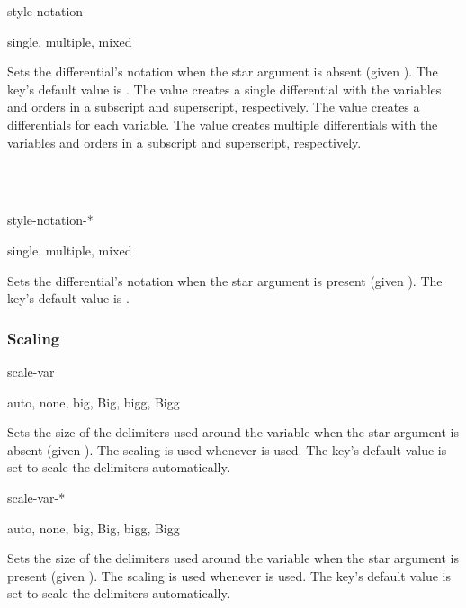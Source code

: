 	\begin{option}{style-notation}
		\begin{values}[default = multiple]
			single, multiple, mixed
		\end{values}
		Sets the differential's notation when the star argument is absent (given ). The key's default value is . The value  creates a single differential with the variables and orders in a subscript and superscript, respectively. The value  creates a differentials for each variable. The value  creates multiple differentials with the variables and orders in a subscript and superscript, respectively.
		
		\begin{example}
			 \\
			 \\
		\end{example}
		
	\end{option}
	
	\begin{option}{style-notation-*}
		\begin{values}[default = single]
			single, multiple, mixed
		\end{values}
		Sets the differential's notation when the star argument is present (given ). The key's default value is .
	\end{option}
	
	\subsubsection*{Scaling}
	
	\begin{option}{scale-var}
		\begin{values}[default = auto]
			auto, none, big, Big, bigg, Bigg
		\end{values}
		Sets the size of the delimiters used around the variable when the star argument is absent (given ). The scaling is used whenever  is used. The key's default value is set to scale the delimiters automatically.
	\end{option}
	
	\begin{option}{scale-var-*}
		\begin{values}[default = auto]
			auto, none, big, Big, bigg, Bigg
		\end{values}
		Sets the size of the delimiters used around the variable when the star argument is present (given ). The scaling is used whenever  is used. The key's default value is set to scale the delimiters automatically.
	\end{option}
	
